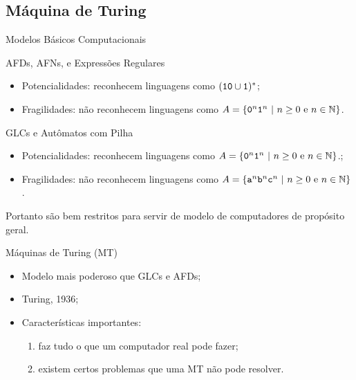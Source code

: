 \documentclass[xcolor=dvipsnames,table]{beamer}
\begin{document}
	\subsection{Máquina de Turing}
	\begin{frame}{Modelos Básicos Computacionais}
		\begin{block}{AFDs, AFNs, e Expressões Regulares}
			\begin{itemize}
				\item Potencialidades: reconhecem linguagens como $({\tt 10} \cup {\tt 1})^*$;
				\item Fragilidades: não reconhecem linguagens como $A = \{ {\tt 0}^n {\tt 1}^n \mbox{ | } n \geq 0 \mbox{ e } n \in \mathbb{N} \}$.
			\end{itemize}
		\end{block} 
		\begin{block}{GLCs e Autômatos com Pilha}
			\begin{itemize}
				\item Potencialidades: reconhecem linguagens como $A = \{ {\tt 0}^n {\tt 1}^n \mbox{ | } n \geq 0 \mbox{ e } n \in \mathbb{N} \}$.;
				\item Fragilidades: não reconhecem linguagens como $A = \{ {\tt a}^n {\tt b}^n {\tt c}^n\mbox{ | } n \geq 0 \mbox{ e } n \in \mathbb{N} \}$.
			\end{itemize}
		\end{block} 
		\begin{alertblock}{}
			Portanto são bem restritos para servir de modelo de computadores de propósito geral.
		\end{alertblock}
	\end{frame}
	
	\begin{frame}{Máquinas de Turing (MT)}
		\begin{itemize}
			\item Modelo mais poderoso que GLCs e AFDs; 
			\item Turing, 1936; 
			\item Características importantes:
				\begin{enumerate}
					\item faz tudo o que um computador real pode fazer;
					\item existem certos problemas que uma MT não pode resolver.
				\end{enumerate}				 
			
		\end{itemize}
	\end{frame}
	
\end{document}
